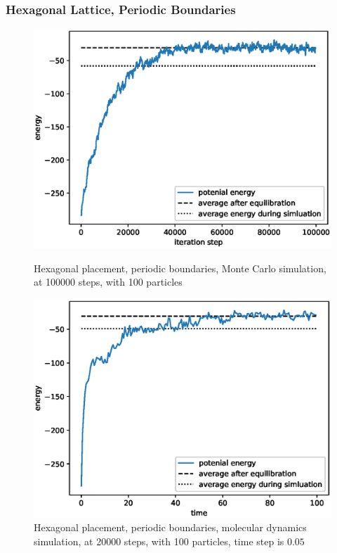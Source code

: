 \documentclass[UTF8,a4paper]{article}
\begin{document}
\subsubsection{Hexagonal Lattice, Periodic Boundaries}
\begin{figure}[H]
	\centering
	\begin{minipage}[t]{0.45\textwidth}
		\centering
		\includegraphics[height=0.2\textheight]{fig/exp2_hex_peri_mc.eps}
		\caption{Hexagonal placement, periodic boundaries, Monte Carlo simulation, at 100000 steps, with 100 particles}
	\end{minipage}\hspace{0.5cm}
	\begin{minipage}[t]{0.45\textwidth}
		\centering
		\includegraphics[height=0.2\textheight]{fig/exp2_hex_peri_md.eps}
		\caption{Hexagonal placement, periodic boundaries, molecular dynamics simulation, at 20000 steps, with 100 particles, time step is $0.05$}
	\end{minipage}
\end{figure}
\end{document}

